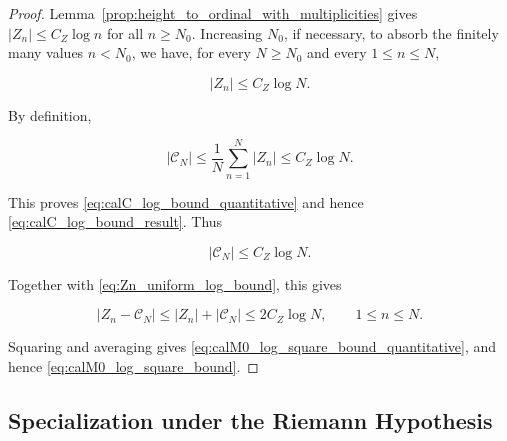 \documentclass[11pt]{amsart}
\numberwithin{equation}{section}
\theoremstyle{plain}
\theoremstyle{definition}
\theoremstyle{remark}
\begin{document}
\begin{proof}
Lemma~\ref{prop:height_to_ordinal_with_multiplicities} gives
\(|Z_n|\le C_Z\log n\) for all \(n\ge N_0\). Increasing \(N_0\), if
necessary, to absorb the finitely many values \(n<N_0\), we have, for
every \(N\ge N_0\) and every \(1\le n\le N\),

\begin{equation}
|Z_n|\le C_Z\log N.
\label{eq:Zn_uniform_log_bound}
\end{equation}

By definition,

\begin{equation}
|\mathcal C_N|
\leq
\frac1N
\sum_{n=1}^{N}|Z_n|
\le
C_Z\log N.
\label{eq:calC_average_log_bound}
\end{equation}

This proves \eqref{eq:calC_log_bound_quantitative} and hence
\eqref{eq:calC_log_bound_result}. Thus

\begin{equation}
|\mathcal C_N|
\le
C_Z\log N.
\label{eq:calC_uniform_log_bound}
\end{equation}

Together with \eqref{eq:Zn_uniform_log_bound}, this gives

\begin{equation}
|Z_n-\mathcal C_N|
\leq
|Z_n|+|\mathcal C_N|
\le
2C_Z\log N,
\qquad
1\leq n\leq N.
\label{eq:complete_zero_centered_uniform_log_bound}
\end{equation}

Squaring and averaging gives
\eqref{eq:calM0_log_square_bound_quantitative}, and hence
\eqref{eq:calM0_log_square_bound}.
\end{proof}

\subsection{Specialization under the Riemann Hypothesis}
\label{subsec:M0_RH_specialization}
\end{document}
